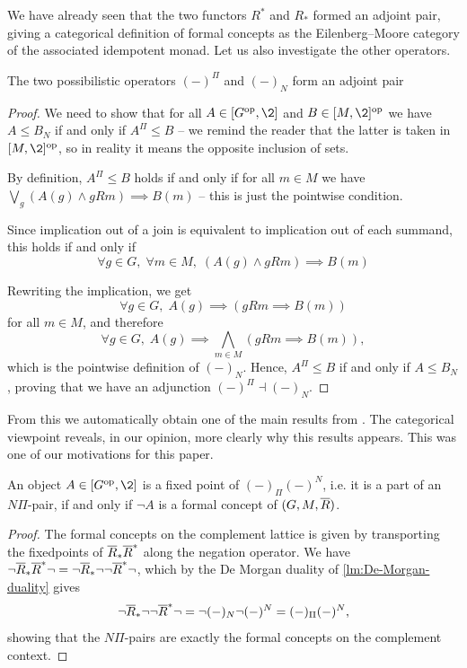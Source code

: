 We have already seen that the two functors $R^*$ and $R_*$ formed an adjoint pair, giving a categorical definition of formal concepts as the Eilenberg--Moore category of the associated idempotent monad. Let us also investigate the other operators. 

\begin{lemma}
    \label{lm:adjoint-Pi-N}
    The two possibilistic operators $(-)^\Pi$ and $(-)_N$ form an adjoint pair
    \begin{center}
    \end{center}
\end{lemma}
\begin{proof}
    We need to show that for all $A\in [G\op,\2]$ and $B\in [M,\2]\op$ we have $A\leq B_N$ if and only if $A^\Pi\leq B$ -- we remind the reader that the latter is taken in $[M,\2]\op$, so in reality it means the opposite inclusion of sets. 
    
    By definition, $A^\Pi\leq B$ holds if and only if for all $m\in M$ we have $\bigvee_g(A(g)\wedge gRm)\implies B(m)$ -- this is just the pointwise condition. 

    Since implication out of a join is equivalent to
    implication out of each summand, this holds if and only if
    \[\forall g\in G,\;\forall m\in M,\;(A(g)\wedge gRm)\implies B(m)\]

    Rewriting the implication, we get
    \[\forall g\in G,\;A(g)\implies (gRm\implies B(m))\]
    for all $m\in M$, and therefore
    \[\forall g\in G,\;A(g)\implies\bigwedge_{m\in M}(gRm\implies B(m)),\]
    which is the pointwise definition of $(-)_N$. Hence, $A^\Pi\leq B$ if and only if $A\leq B_N$, proving that we have an adjunction $(-)^\Pi\dashv (-)_N$.
\end{proof}

From this we automatically obtain one of the main results from \cite{yakub-djouadi-dubois-prade_2016}. The categorical viewpoint reveals, in our opinion, more clearly why this results appears. This was one of our motivations for this paper. 

\begin{corollary}
    An object $A \in [G\op, \2]$ is a fixed point of $(-)_\Pi (-)^N$, i.e. it is a part of an $N\Pi$-pair, if and only if $\neg A$ is a formal concept of $(G,M,\overline{R})$.
\end{corollary}
\begin{proof}
    The formal concepts on the complement lattice is given by transporting the fixedpoints of $\overline{R}_*\overline{R}^*$ along the negation operator. We have $\neg\overline{R}_*\overline{R}^*\neg = \neg\overline{R}_* \neg\neg\overline{R}^*\neg$, which by the De Morgan duality of \cref{lm:De-Morgan-duality} gives 
    \[\neg\overline{R}_* \neg \neg \overline{R}^*\neg = \neg (-)_N \neg (-)^N = (-)_\Pi (-)^N,\]
    showing that the $N\Pi$-pairs are exactly the formal concepts on the complement context. 
\end{proof}

